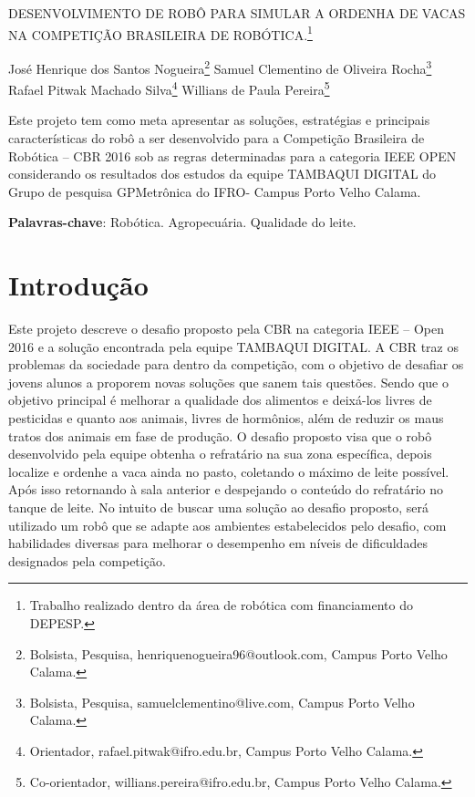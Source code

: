 \documentclass[article,12pt,onesidea,4paper,english,brazil]{abntex2}
\begin{document}
	
	
	\frenchspacing 
	
	\begin{center}
		\LARGE DESENVOLVIMENTO DE ROBÔ PARA SIMULAR A ORDENHA DE VACAS NA COMPETIÇÃO BRASILEIRA DE ROBÓTICA.\footnote{ Trabalho realizado dentro da área de robótica com financiamento do DEPESP.}
		
		\normalsize
		José Henrique dos Santos Nogueira\footnote{Bolsista, Pesquisa, henriquenogueira96@outlook.com, Campus Porto Velho Calama.} 
		Samuel Clementino de Oliveira Rocha\footnote{Bolsista, Pesquisa, samuelclementino@live.com, Campus Porto Velho Calama.} \\
	Rafael Pitwak Machado Silva\footnote{ Orientador, rafael.pitwak@ifro.edu.br, Campus Porto Velho Calama.} 
		Willians de Paula Pereira\footnote{ Co-orientador, willians.pereira@ifro.edu.br, Campus Porto Velho Calama.} 
	\end{center}
	
	\begin{resumoumacoluna}
		Este projeto tem como meta apresentar as soluções, estratégias e principais características do robô a ser desenvolvido para a Competição Brasileira de Robótica – CBR 2016 sob as regras determinadas para a categoria IEEE OPEN considerando os resultados dos estudos da equipe TAMBAQUI DIGITAL do Grupo de pesquisa GPMetrônica do IFRO- Campus Porto Velho Calama.
		
		\vspace{\onelineskip}
		
		\noindent
		\textbf{Palavras-chave}: Robótica. Agropecuária. Qualidade do leite.
	\end{resumoumacoluna}
	
	\section*{Introdução}
	
	Este projeto descreve o desafio proposto pela CBR na categoria IEEE – Open 2016 e a solução encontrada pela equipe TAMBAQUI DIGITAL. A CBR traz os problemas da sociedade para dentro da competição, com o objetivo de desafiar os jovens alunos a proporem novas soluções que sanem tais questões. Sendo que o objetivo principal é melhorar a qualidade dos alimentos e deixá-los livres de pesticidas e quanto aos animais, livres de hormônios, além de reduzir os maus tratos dos animais em fase de produção. O desafio proposto visa que o robô desenvolvido pela equipe obtenha o refratário na sua zona específica, depois localize e ordenhe a vaca ainda no pasto, coletando o máximo de leite possível. Após isso retornando à sala anterior e despejando o conteúdo do refratário no tanque de leite. No intuito de buscar uma solução ao desafio proposto, será utilizado um robô que se adapte aos ambientes estabelecidos pelo desafio, com habilidades diversas para melhorar o desempenho em níveis de dificuldades designados pela competição.
	
\end{document}
